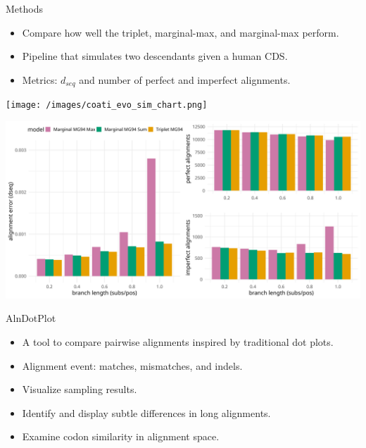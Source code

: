 \documentclass[aspectratio=169,font=14pt]{beamer}
\begin{document}
\begin{frame}{Methods} %
    \begin{itemize}
        \item Compare how well the triplet, marginal-max, and marginal-max perform.
        \item Pipeline that simulates two descendants given a human CDS.
        \item Metrics: $d_{seq}$ and number of perfect and imperfect alignments.
    \end{itemize}
\centering
\texttt{[image: /images/coati\_evo\_sim\_chart.png]}
\end{frame} %

\begin{frame}[c] %
\centering
\includegraphics[height = 0.9\textheight]{defense/images/results_marginal_triplet_mg.png}
\end{frame} %

\begin{frame}{AlnDotPlot} %
\begin{itemize}
    \item A tool to compare pairwise alignments inspired by traditional dot plots.
    \item Alignment event: matches, mismatches, and indels.
    \item Visualize sampling results.
    \item Identify and display subtle differences in long alignments.
    \item Examine codon similarity in alignment space.
\end{itemize}
\end{frame} %
\end{document}
